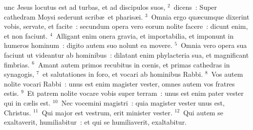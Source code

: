 \bchapter
{}unc Jesus locutus est ad turbas, et ad discipulos suos,
${}^{2}$~dicens~: Super cathedram Moysi sederunt scrib\ae\ et pharis\ae i.
${}^{3}$~Omnia ergo qu\ae cumque dixerint vobis, servate, et facite~: secundum opera vero eorum nolite facere~: dicunt enim, et non faciunt.
${}^{4}$~Alligant enim onera gravia, et importabilia, et imponunt in humeros hominum~: digito autem suo nolunt ea movere.
${}^{5}$~Omnia vero opera sua faciunt ut videantur ab hominibus~: dilatant enim phylacteria sua, et magnificant fimbrias.
${}^{6}$~Amant autem primos recubitus in cœnis, et primas cathedras in synagogis,
${}^{7}$~et salutationes in foro, et vocari ab hominibus Rabbi.
${}^{8}$~Vos autem nolite vocari Rabbi~: unus est enim magister vester, omnes autem vos fratres estis.
${}^{9}$~Et patrem nolite vocare vobis super terram~: unus est enim pater vester qui in c\ae lis est.
${}^{10}$~Nec vocemini magistri~: quia magister vester unus est, Christus.
${}^{11}$~Qui major est vestrum, erit minister vester.
${}^{12}$~Qui autem se exaltaverit, humiliabitur~: et qui se humiliaverit, exaltabitur.


